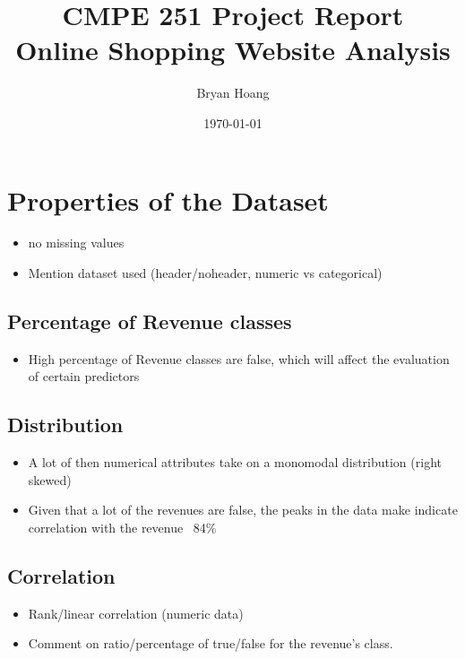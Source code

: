 \documentclass[
  draft,
]{memreport}
\title{
  \textbf{CMPE 251 Project Report}\\
  Online Shopping Website Analysis
}
\author{Bryan Hoang}
\date{\today}
\begin{document}
  \begin{titlingpage}
    \maketitle
  \end{titlingpage}
  \frontmatter
  \clearpage
  \tableofcontents
  \clearpage
  \listoffigures
  \clearpage
  \listoftables
  \mainmatter{}

  
  \chapter{Properties of the Dataset}
  \begin{itemize}
    \item no missing values
    \item Mention dataset used (header/noheader, numeric vs categorical)
  \end{itemize}

  \section{Percentage of Revenue classes}
  \begin{itemize}
    \item High percentage of Revenue classes are false, which will affect the evaluation of certain predictors
  \end{itemize}

  \section{Distribution}
  \begin{itemize}
    \item A lot of then numerical attributes take on a monomodal distribution (right skewed)
    \item Given that a lot of the revenues are false, the peaks in the data make indicate correlation with the revenue ~84\%
  \end{itemize}

  \section{Correlation}
  \begin{itemize}
    \item Rank/linear correlation (numeric data)
    \item Comment on ratio/percentage of true/false for the revenue's class.
  \end{itemize}
\end{document}
